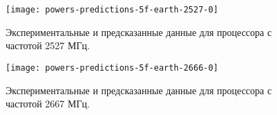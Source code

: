 \begin{figure}[H]
    \begin{center}
        \texttt{[image: powers-predictions-5f-earth-2527-0]}
        \caption{Экспериментальные и предсказанные данные для процессора с частотой 2527 МГц.}
        \label{img:powers-predictions-5f-earth-2527-0}
    \end{center}
\end{figure}

\begin{figure}[H]
    \begin{center}
        \texttt{[image: powers-predictions-5f-earth-2666-0]}
        \caption{Экспериментальные и предсказанные данные для процессора с частотой 2667 МГц.}
        \label{img:powers-predictions-5f-earth-2666-0}
    \end{center}
\end{figure}